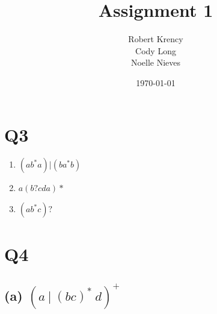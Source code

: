 \documentclass[12pt]{article}
\date{\today}
\author{Robert Krency \\ Cody Long \\ Noelle Nieves}
\title{Assignment 1}
\begin{document}
\maketitle
\thispagestyle{fancy}

\section*{Q3}

\begin{enumerate}[label=(\alph*)]
    \item $(ab^*a)|(ba^*b)$
    \item $a(b?cda)*$
    \item $(ab^*c)?$
\end{enumerate}

\section*{Q4}

\subsection*{(a) $(a\ |\ (bc)^*\ d)^+$}
\end{document}
